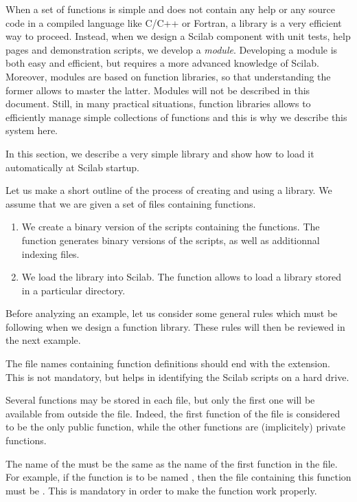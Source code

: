 When a set of functions is simple and does not 
contain any help or any source code in a compiled language 
like C/C++ or Fortran, a library is a very efficient way to proceed.
Instead, when we design a Scilab component with unit tests, help pages and 
demonstration scripts, we develop a \emph{module}. Developing 
a module is both easy and efficient, but requires a more advanced knowledge
of Scilab. Moreover, modules are based on function libraries, so that 
understanding the former allows to master the latter. 
Modules will not be described in this document.
Still, in many practical situations, function libraries allows to 
efficiently manage simple collections of functions and this is why
we describe this system here.

In this section, we describe a very simple library and
show how to load it automatically at Scilab startup.

Let us make a short outline of the process of creating 
and using a library. We assume that we are given a set of  files 
containing functions. 
\begin{enumerate}
\item We create a binary version of the scripts containing the functions. 
The  function generates binary versions of the scripts, as well as 
additionnal indexing files. 
\item We load the library into Scilab. The  function allows to load 
a library stored in a particular directory. 
\end{enumerate}

Before analyzing an example, let us consider some general rules which must be 
following when we design a function library. These rules will then be reviewed 
in the next example.

The file names containing function definitions should end with the 
extension. This is not mandatory, but helps in identifying the Scilab scripts 
on a hard drive. 

Several functions may be stored in each  file, but only the first one will be available 
from outside the file. Indeed, the first function of the file is considered
to be the only public function, while the other functions are (implicitely)
private functions. 

The name of the  must be the same as the name of the 
first function in the file. For example, if the function is to be named 
, then the file containing this function must be . This is mandatory
in order to make the  function work properly.

